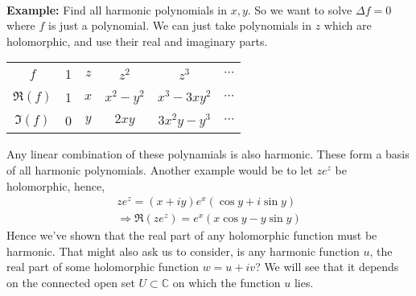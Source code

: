 \documentclass{article}
\begin{document}
\noindent \\ \textbf{Example:} Find all harmonic polynomials in $x,y$. So we want to solve $\Delta f = 0$
where $f$ is just a polynomial. We can just take polynomials in $z$ which are holomorphic, and use
their real and imaginary parts.
\begin{center}
	\begin{tabular}{c | c c c c c}
		$f$      & 1 & $z$ & $z^2$     & $z^3$       & $\cdots$ \\
		$\Re(f)$ & 1 & $x$ & $x^2-y^2$ & $x^3-3xy^2$ & $\cdots$ \\
		$\Im(f)$ & 0 & $y$ & $2xy$     & $3x^2y-y^3$ & $\cdots$ \\
	\end{tabular}
\end{center}
Any linear combination of these polynamials is also harmonic. These form a basis of all harmonic
polynomials. Another example would be to let $z e^z$ be holomorphic, hence,
\begin{gather*}
	z e^z = (x+iy) e^x (\cos y + i \sin y) \\
	\Rightarrow \Re(ze^z) = e^x(x \cos y - y \sin y)
\end{gather*}
Hence we've shown that the real part of any holomorphic function must be harmonic. That might also
ask us to consider, is any harmonic function $u$, the real part of some holomorphic function $w = u
	+ iv$? We will see that it depends on the connected open set $U \subset \mathbb{C}$ on which the
function $u$ lies.
\end{document}
